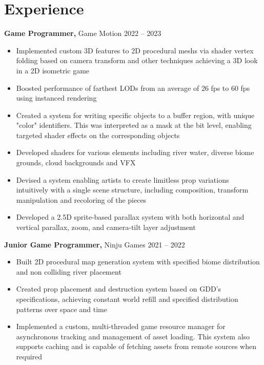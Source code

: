 \documentclass[10pt]{article}       %
\begin{document}
\section*{Experience}
\textbf{Game Programmer,} {Game Motion} \hfill 2022 -- 2023\\
\vspace{-9pt}
\begin{itemize}
	\item Implemented custom 3D features to 2D procedural meshs via shader vertex folding based
        on camera transform and other techniques achieving a 3D look in a 2D isometric game
	\item Boosted performance of farthest LODs from an average of 26 fps to 60 fps using instanced rendering
	\item Created a system for writing specific objects to a buffer region, with
        unique "color" identifiers. This was interpreted as a mask at the bit level,
        enabling targeted shader effects on the corresponding objects
    \item Developed shaders for various elements including river water, diverse biome grounds, cloud backgrounds and VFX
	\item Devised a system enabling artists to create limitless prop variations intuitively with
        a single scene structure, including composition, transform manipulation and recoloring of the pieces
    \item Developed a 2.5D sprite-based parallax system with both horizontal and vertical
        parallax, zoom, and camera-tilt layer adjustment

\end{itemize}

\textbf{Junior Game Programmer,}  {Ninju Games} \hfill 2021 -- 2022 \\
\vspace{-9pt}
\begin{itemize}
	\item Built 2D procedural map generation system with specified biome distribution and non colliding river placement
	\item Created prop placement and destruction system based on GDD's specifications, achieving constant world refill and specified distribution patterns over space and time
	\item Implemented a custom, multi-threaded game resource manager for asynchronous tracking and management of asset loading. This system also supports caching and is capable of fetching assets from remote sources when required
\end{itemize}
\end{document}
